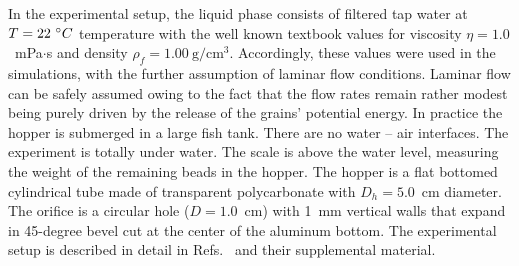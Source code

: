 \documentclass[twoside,twocolumn,9pt]{article}
\begin{document}
In the experimental setup, the liquid phase consists of filtered tap water at $T=22~\degree C$ temperature with the well known textbook values 
for viscosity $\eta = 1.0$~mPa$\cdot$s and density $\rho_f=1.00~\mathrm{g/cm^3}$. Accordingly, these values were used in the 
simulations, with the further assumption of laminar flow conditions. 
Laminar flow can be safely assumed owing to the fact 
that the flow rates remain rather modest being purely 
driven by the release of the grains' potential energy.
In practice the hopper is submerged in a large fish tank. There are 
no water -- air interfaces. The experiment is totally under water. 
The scale is above the water level, measuring the weight of 
the remaining beads in the hopper. 
The hopper is a flat 
bottomed cylindrical tube made of transparent polycarbonate with $D_h = 5.0$~cm diameter. 
The orifice is a circular hole ($D=1.0$~cm) with 1~mm vertical walls that expand in 45-degree bevel cut at the center of the aluminum bottom. 
The experimental setup is described in detail in Refs.~\cite{koivistoSubmitted,koivisto2017PRE} and their supplemental material.
\end{document}
